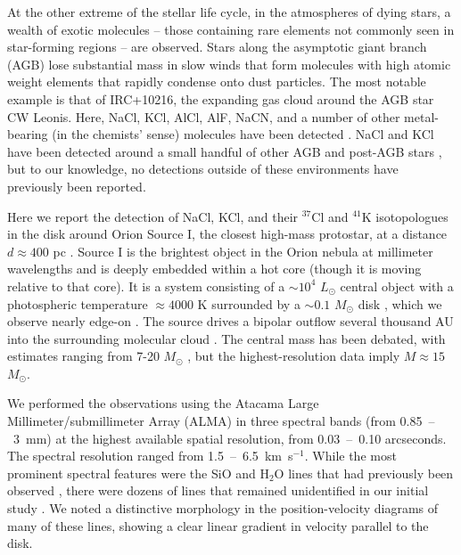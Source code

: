 \documentclass[12pt]{article}
\newcommand{\msun}{\ensuremath{M_{\odot}}\xspace}			%
\newcommand{\lsun}{\ensuremath{L_{\odot}}\xspace}			%
\newcommand{\water}{H$_{2}$O\xspace}		%
\newcommand{\kms}{\textrm{km~s}\ensuremath{^{-1}}\xspace}	%
\begin{document}
At the other extreme of the stellar life cycle, in the atmospheres of dying
stars, a wealth of exotic molecules -- those containing rare elements not
commonly seen in star-forming regions -- are observed.  Stars along the
asymptotic giant branch (AGB) lose substantial mass in slow winds
\cite{Herwig2005a} that form molecules with high atomic weight elements that
rapidly condense onto dust particles.  The most notable example is that of
IRC+10216, the expanding gas cloud around the AGB star CW Leonis.  Here, NaCl,
KCl, AlCl, AlF, NaCN, and a number of other metal-bearing (in the chemists'
sense) molecules have been detected \cite{Agundez2012a,Zack2011a}.  NaCl and
KCl have been detected around a small handful of other AGB and post-AGB stars
\cite{Milam2007a,Highberger2003a,Sanchez-Contreras2018a}, but to our knowledge,
no detections outside of these environments have previously been reported.

Here we report the detection of NaCl, KCl, and their $^{37}$Cl and $^{41}$K
isotopologues in the disk around Orion Source I, the closest high-mass
protostar, at a distance $d\approx400$ pc \cite{Grossschedl2018a}.   Source I
is the brightest object in the Orion nebula at millimeter wavelengths and is
deeply embedded within a hot core (though it is moving relative to that core).
It is a system consisting of a $\sim10^4$ \lsun central object with a
photospheric temperature $\approx4000$ K \cite{Testi2010a} surrounded by a
$\sim0.1$ \msun disk \cite{Plambeck2016a}, which we observe nearly edge-on
\cite{Matthews2010a}.  The source drives a bipolar outflow several thousand AU
into the surrounding molecular cloud \cite{Plambeck2009a}. The central mass has
been debated, with estimates ranging from 7-20 \msun
\cite{Matthews2010a,Plambeck2016a}, but the highest-resolution data imply
$M\approx15$ \msun  \cite{Ginsburg2018b}.

We performed the observations using the Atacama Large Millimeter/submillimeter
Array (ALMA) in three spectral bands (from 0.85~--~3~mm) at the highest
available spatial resolution, from 0.03~--~0.10 arcseconds. The spectral
resolution ranged from 1.5~--~6.5~\kms.  While the most prominent spectral
features were the SiO and \water lines that had previously been observed
\cite{Goddi2009a,Niederhofer2012a,Greenhill2013a,Hirota2014a}, there were
dozens of lines that remained unidentified in our initial study
\cite{Ginsburg2018b}.  We noted a distinctive morphology in the
position-velocity diagrams of many of these lines, showing a clear linear
gradient in velocity parallel to the disk. 
\end{document}
